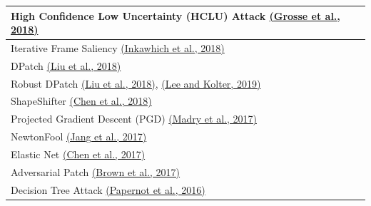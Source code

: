 \begin{table}[H]
\begin{tabularx}{\linewidth}{|X|}
        High Confidence Low Uncertainty (HCLU) Attack \href{https://arxiv.org/abs/1812.02606}{(Grosse et al., 2018)}                                                                                                         \\ \hline
        Iterative Frame Saliency \href{https://arxiv.org/abs/1811.11875}{(Inkawhich et al., 2018)}                                                                                                                           \\ \hline
        DPatch \href{https://arxiv.org/abs/1806.02299v4}{(Liu et al., 2018)}                                                                                                                                                 \\ \hline
        Robust DPatch \href{https://arxiv.org/abs/1806.02299v4}{(Liu et al., 2018)}, \href{https://arxiv.org/abs/1906.11897}{(Lee and Kolter, 2019)}                                                                         \\ \hline
        ShapeShifter \href{https://arxiv.org/abs/1804.05810}{(Chen et al., 2018)}                                                                                                                                            \\ \hline
        Projected Gradient Descent (PGD) \href{https://arxiv.org/abs/1706.06083}{(Madry et al., 2017)}                                                                                                                       \\ \hline
        NewtonFool \href{http://doi.acm.org/10.1145/3134600.3134635}{(Jang et al., 2017)}                                                                                                                                    \\ \hline
        Elastic Net \href{https://arxiv.org/abs/1709.04114}{(Chen et al., 2017)}                                                                                                                                             \\ \hline
        Adversarial Patch \href{https://arxiv.org/abs/1712.09665}{(Brown et al., 2017)}                                                                                                                                      \\ \hline
        Decision Tree Attack \href{https://arxiv.org/abs/1605.07277}{(Papernot et al., 2016)}                                                                                                                                \\ \hline

\end{tabularx}
\end{table}
